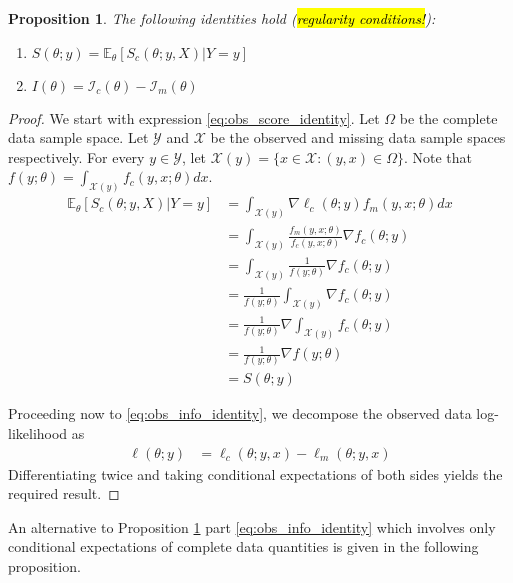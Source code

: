\documentclass[11pt, oneside]{article}   	%
\newcommand{\bE}{\mathbb{E}}
\newtheorem{proposition}{Proposition}[section]
\begin{document}
\begin{proposition}
    \label{thm:EM_decomp}
    The following identities hold (\hl{regularity conditions!}):
    \begin{enumerate}[label=(\roman*)]
        \item $S(\theta; y) = \bE_\theta [S_c(\theta; y, X)|Y=y]$ \label{eq:obs_score_identity}
        \item $I(\theta) = \mathcal{I}_c(\theta) - \mathcal{I}_m(\theta)$ \label{eq:obs_info_identity}
    \end{enumerate}
\end{proposition}

\begin{proof}
    We start with expression \ref{eq:obs_score_identity}. Let $\Omega$ be the complete data sample space. Let $\mathcal{Y}$ and $\mathcal{X}$ be the observed and missing data sample spaces respectively. For every $y \in \mathcal{Y}$, let $\mathcal{X}(y) = \{ x \in \mathcal{X}: (y,x) \in \Omega\}$. Note that $f(y; \theta) = \int_{\mathcal{X}(y)} f_c(y, x; \theta) dx$.
    \begin{align}
        \bE_\theta [S_c(\theta; y, X)|Y=y] &= \int_{\mathcal{X}(y)} \nabla \ell_c(\theta; y) f_m(y, x; \theta) dx \nonumber\\
        &= \int_{\mathcal{X}(y)} \frac{f_m(y, x; \theta)}{f_c(y, x; \theta)} \nabla f_c(\theta; y) \nonumber\\
        &= \int_{\mathcal{X}(y)} \frac{1}{f(y; \theta)} \nabla f_c(\theta; y)\nonumber\\
        &= \frac{1}{f(y; \theta)} \int_{\mathcal{X}(y)} \nabla f_c(\theta; y)\nonumber\\
        &= \frac{1}{f(y; \theta)} \nabla \int_{\mathcal{X}(y)} f_c(\theta; y) \nonumber\\
        &= \frac{1}{f(y; \theta)} \nabla f(y; \theta)\nonumber\\
        &= S(\theta; y) \nonumber
    \end{align}

    Proceeding now to \ref{eq:obs_info_identity}, we decompose the observed data log-likelihood as
    \begin{align*}
        \ell(\theta; y) &= \ell_c(\theta; y, x) - \ell_m(\theta; y, x)
    \end{align*}
    Differentiating twice and taking conditional expectations of both sides yields the required result.
\end{proof}

An alternative to Proposition \ref{thm:EM_decomp} part \ref{eq:obs_info_identity} which involves only conditional expectations of complete data quantities is given in the following proposition.
\end{document}
